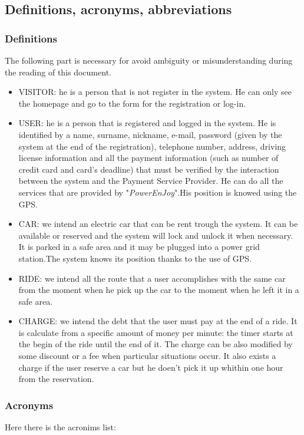 \subsection{Definitions, acronyms, abbreviations} \label{subsec:def-ac-ab}

\subsubsection{Definitions} \label{def}
The following part is necessary for avoid ambiguity or misunderstanding during the reading of this document. 
\begin{itemize}
\item VISITOR: he is a person that is not register in the system. He can only see the homepage and go to the form for the registration or log-in.
\item USER: he is a person that is registered and logged in the system. He is identified by a name, surname, nickname, e-mail, password (given by the system at the end of the registration), telephone number, address, driving license information and all the payment information (such as number of credit card and card's deadline) that must be verified by the interaction between the system and the Payment Service Provider. He can do all the services that are provided by "\emph{PowerEnJoy}".His position is knowed using the GPS.
\item CAR: we intend an electric car that can be rent trough the system. It can be available or reserved and the system will lock and unlock it when necessary. It is parked in a safe area and it may be plugged into a power grid station.The system knows its position thanks to the use of GPS.
\item RIDE: we intend all the route that a user accomplishes with the same car from the moment when he pick up the car to the moment when he left it in a safe area.   
\item CHARGE: we intend the debt that the user must pay at the end of a ride. It is calculate from a specific amount of money per minute: the timer starts at the begin of the ride until the end of it. The charge can be also modified by some discount or a fee when particular situations occur. It also exists a charge if the user reserve a car but he doen't pick it up whithin one hour from the reservation.  

\end{itemize}

\subsubsection{Acronyms} \label{acr}
Here there is the acronims list:

